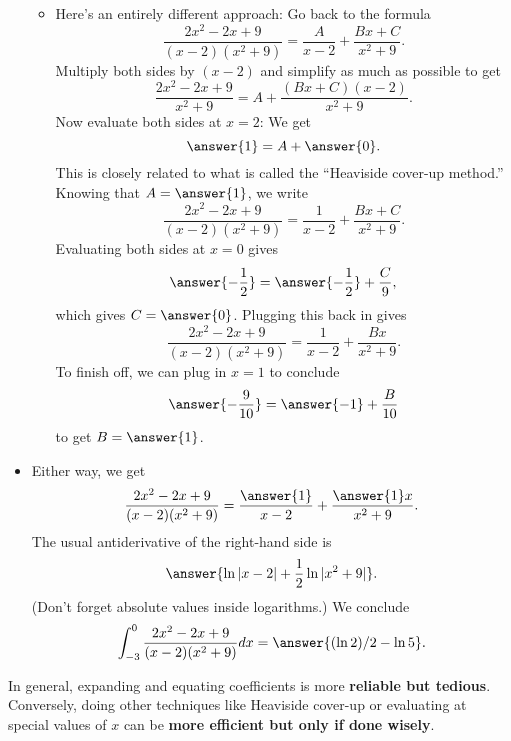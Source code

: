 \documentclass{ximera}
\begin{document}
\begin{example}
\begin{itemize}
\begin{itemize}
\item Here's an entirely different approach: Go back to the formula
\[\frac{2 x^2 - 2x + 9}{(x-2)(x^2+9)} = \frac{A}{x-2} + \frac{Bx + C}{x^2+9}. \]
Multiply both sides by $(x-2)$ and simplify as much as possible to get
\[ \frac{2 x^2 - 2x + 9}{x^2+9} = A + \frac{(Bx + C)(x-2)}{x^2+9}. \]
Now evaluate both sides at $x = 2$: We get
\[ \answer{1} = A + \answer{0}. \]
This is closely related to what is called the ``Heaviside cover-up method.''
Knowing that $A = \answer{1}$, we write
\[\frac{2 x^2 - 2x + 9}{(x-2)(x^2+9)} = \frac{1}{x-2} + \frac{Bx + C}{x^2+9}. \]
Evaluating both sides at $x = 0$ gives
\[ \answer{-\frac{1}{2}} = \answer{- \frac{1}{2}} + \frac{C}{9}, \]
which gives $C = \answer{0}$. Plugging this back in gives
\[\frac{2 x^2 - 2x + 9}{(x-2)(x^2+9)} = \frac{1}{x-2} + \frac{Bx}{x^2+9}. \]
To finish off, we can plug in $x = 1$ to conclude
\[ \answer{-\frac{9}{10}} = \answer{-1} + \frac{B}{10} \]
to get $B = \answer{1}$.
\end{itemize}
\item Either way, we get
\[ \frac{2x^2 - 2x + 9}{(x-2)(x^2+9)} = \frac{\answer{1}}{x-2} + \frac{\answer{1}x}{x^2+9}. \]
The usual antiderivative of the right-hand side is
\[  \answer{\ln |x-2| + \frac{1}{2} \ln |x^2+9|}. \]
(Don't forget absolute values inside logarithms.)
We conclude
\[ \int_{-3}^0 \frac{2 x^2 - 2x + 9}{(x-2)(x^2+9)} dx = \answer{(\ln 2)/2 - \ln 5} . \]
\end{itemize}
\end{example}

In general, expanding and equating coefficients is more \textbf{reliable but tedious}. Conversely, doing other techniques like Heaviside cover-up or evaluating at special values of $x$ can be \textbf{more efficient but only if done wisely}.
\end{document}
